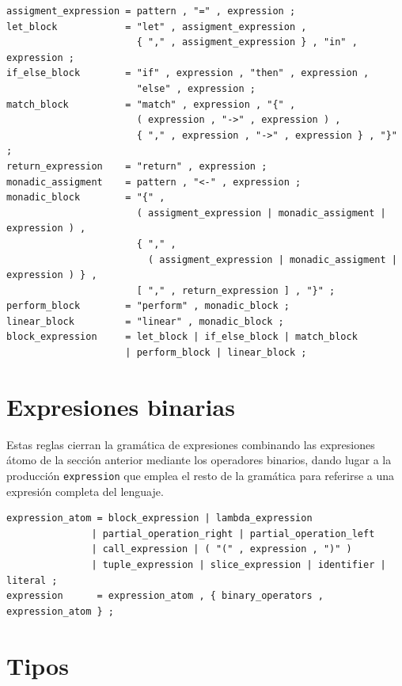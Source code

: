 \begin{lstlisting}[language={}, caption=Reglas de las expresiones de bloque]
assigment_expression = pattern , "=" , expression ;
let_block            = "let" , assigment_expression ,
                       { "," , assigment_expression } , "in" , expression ;
if_else_block        = "if" , expression , "then" , expression ,
                       "else" , expression ;
match_block          = "match" , expression , "{" ,
                       ( expression , "->" , expression ) ,
                       { "," , expression , "->" , expression } , "}" ;
return_expression    = "return" , expression ;
monadic_assigment    = pattern , "<-" , expression ;
monadic_block        = "{" ,
                       ( assigment_expression | monadic_assigment | expression ) ,
                       { "," ,
                         ( assigment_expression | monadic_assigment | expression ) } ,
                       [ "," , return_expression ] , "}" ;
perform_block        = "perform" , monadic_block ;
linear_block         = "linear" , monadic_block ;
block_expression     = let_block | if_else_block | match_block
                     | perform_block | linear_block ;
\end{lstlisting}

\section{Expresiones binarias}
\label{sec:ebnf-binarias}

Estas reglas cierran la gramática de expresiones combinando las expresiones átomo de la sección anterior mediante los operadores binarios, dando lugar a la producción \lstinline|expression| que emplea el resto de la gramática para referirse a una expresión completa del lenguaje.

\begin{lstlisting}[language={}, caption=Reglas de las expresiones binarias]
expression_atom = block_expression | lambda_expression
               | partial_operation_right | partial_operation_left
               | call_expression | ( "(" , expression , ")" )
               | tuple_expression | slice_expression | identifier | literal ;
expression      = expression_atom , { binary_operators , expression_atom } ;
\end{lstlisting}

\section{Tipos}
\label{sec:ebnf-tipos}

